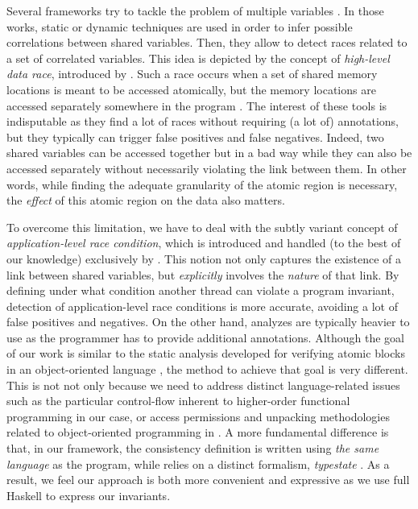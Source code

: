 \documentclass[submission,copyright,creativecommons]{eptcs}
\begin{document}
Several frameworks try to tackle the problem of multiple variables \cite{muvi-automatically-inferring,colorsafe-architectural-support,finding-concurrency-bugs,high-level-data,detection-transactional-memory,practical-verification-high-level}.
In those works, static or dynamic techniques are used in order to infer possible correlations between shared variables. 
Then, they allow to detect races related to a set of correlated variables.
This idea is depicted by the concept of {\em high-level data race}, introduced by \cite{high-level-data}. 
Such a race occurs when a set of shared memory locations is meant to be accessed atomically, but the memory locations are accessed separately somewhere in the program \cite{detection-transactional-memory,practical-verification-high-level}. 
The interest of these tools is indisputable as they find a lot of races without requiring (a lot of) annotations, but they typically can trigger false positives and false negatives. 
Indeed, two shared variables can be accessed together but in a bad way while they can also be accessed separately without necessarily violating the link between them.
In other words, while finding the adequate granularity of the atomic region is necessary, the \emph{effect} of this atomic region on the data also matters.  

To overcome this limitation, we have to deal with the subtly variant concept of {\em application-level race condition}, which is introduced and handled (to the best of our knowledge) exclusively by \cite{verifying-correct-usage}. This notion not only captures the existence of a link between shared variables, but {\em explicitly} involves the {\em nature} of that link. By defining under what condition another thread can violate a program invariant, detection of application-level race conditions is more accurate, avoiding a lot of false positives and negatives. On the other hand, analyzes are typically heavier to use as the programmer has to provide additional annotations.    
Although the goal of our work is similar to the static analysis developed for verifying atomic blocks in an object-oriented language \cite{verifying-correct-usage}, the method to achieve that goal is very different. This is not not only because we need to address distinct language-related issues such as the particular control-flow inherent to higher-order functional programming in our case, or access permissions and unpacking methodologies related to object-oriented programming in \cite{verifying-correct-usage}. 
A more fundamental difference is that, in our framework, the consistency definition is written using \emph{the same language} as the program, while \cite{verifying-correct-usage} relies on a distinct formalism, \emph{typestate} \cite{typestates-for-objects}.
As a result, we feel our approach is both more convenient and expressive as we use full Haskell to express our invariants.
\end{document}
